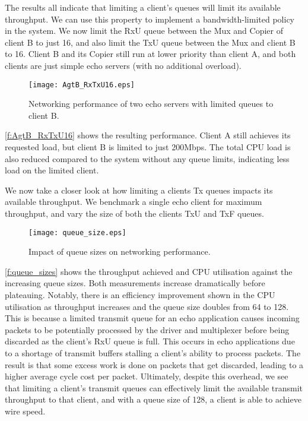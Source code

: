 The results all indicate that limiting a client's queues will limit its available throughput. We can use this property to implement 
a bandwidth-limited policy in the system. We now limit the RxU queue between the Mux and Copier of client B to just 16, and also
limit the TxU queue between the Mux and client B to 16. Client B and its Copier still run at lower priority than client A, and both
clients are just simple echo servers (with no additional overload).

\begin{figure}[h]
    \centering
    \texttt{[image: AgtB\_RxTxU16.eps]}
    \caption{Networking performance of two echo servers with limited queues to client B.}
    \label{f:AgtB_RxTxU16}
\end{figure}

\autoref{f:AgtB_RxTxU16} shows the resulting performance. Client A still achieves its requested load, but client B is limited
to just 200Mbps. The total CPU load is also reduced compared to the system without any queue limits, indicating less load on 
the limited client.

We now take a closer look at how limiting a clients Tx queues impacts its available throughput. We benchmark a single 
echo client for maximum throughput, and vary the size of both the clients TxU and TxF queues. 

\begin{figure}[h]
    \centering
    \texttt{[image: queue\_size.eps]}
    \caption{Impact of queue sizes on networking performance.}
    \label{f:queue_sizes}
\end{figure}

\autoref{f:queue_sizes} shows the throughput achieved and CPU utilisation against the increasing queue sizes. Both 
measurements increase dramatically before plateauing. Notably, there is an efficiency improvement shown in the CPU utilisation
as throughput increases and the queue size doubles from 64 to 128. This is because a limited transmit queue
for an echo application causes incoming packets to be potentially processed by the driver and multiplexer before 
being discarded as the client's RxU queue is full.
This occurs in echo applications due to a shortage of transmit buffers stalling a client's ability to process packets. The
result is that some excess work is done on packets that get discarded, leading to a higher average cycle cost per packet. 
Ultimately, despite this overhead, we see that limiting a client's transmit queues can effectively limit the available transmit
throughput to that client, and with a queue size of 128, a client is able to achieve wire speed.\\

